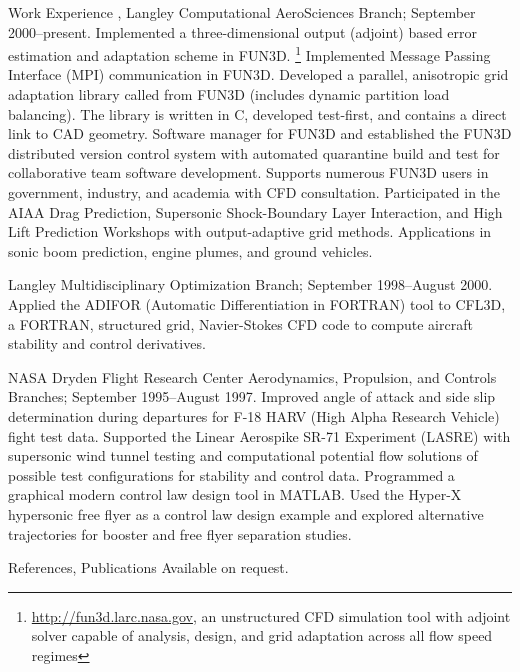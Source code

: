 \documentclass{resume}
\begin{document}
\begin{category}{Work Experience}
, Langley Computational AeroSciences Branch;
September 2000--present.
Implemented a three-dimensional output (adjoint) based error
estimation and adaptation scheme in FUN3D.%
\footnote{\url{http://fun3d.larc.nasa.gov}, an unstructured CFD simulation tool with adjoint solver capable of analysis, design, and grid adaptation
across all flow speed regimes} 
Implemented Message Passing Interface (MPI) communication in FUN3D.
Developed a parallel, anisotropic grid adaptation
library called from FUN3D (includes dynamic partition load balancing).
The library is
written in C, developed test-first, and contains a direct link to CAD geometry.
Software manager for FUN3D and established the FUN3D distributed version 
control system with automated quarantine build and test
for collaborative team software development.
Supports numerous FUN3D users in government, industry, and academia with CFD
consultation.
Participated in the AIAA Drag Prediction,
Supersonic Shock-Boundary Layer Interaction,
and High Lift Prediction Workshops with output-adaptive grid methods.
Applications in sonic boom prediction, engine plumes, and ground vehicles.

 Langley Multidisciplinary Optimization Branch;
September 1998--August 2000.
Applied the ADIFOR (Automatic Differentiation in FORTRAN) tool to
CFL3D, a FORTRAN, structured grid, Navier-Stokes CFD code to compute
aircraft stability and control derivatives.

NASA Dryden Flight Research Center Aerodynamics, Propulsion, and Controls
Branches; September 1995--August 1997. 
Improved angle of attack and
side slip determination during departures for F-18 HARV (High Alpha
Research Vehicle) fight test data. Supported the Linear Aerospike
SR-71 Experiment (LASRE) with supersonic wind tunnel testing and
computational potential flow solutions of possible test configurations
for stability and control data. Programmed a graphical modern control
law design tool in MATLAB. Used the Hyper-X hypersonic free flyer as a
control law design example and explored alternative trajectories for
booster and free flyer separation studies.


\end{category}


\begin{category}{References, Publications} 
\citemnobullet Available on request.
\end{category}
\end{document}
